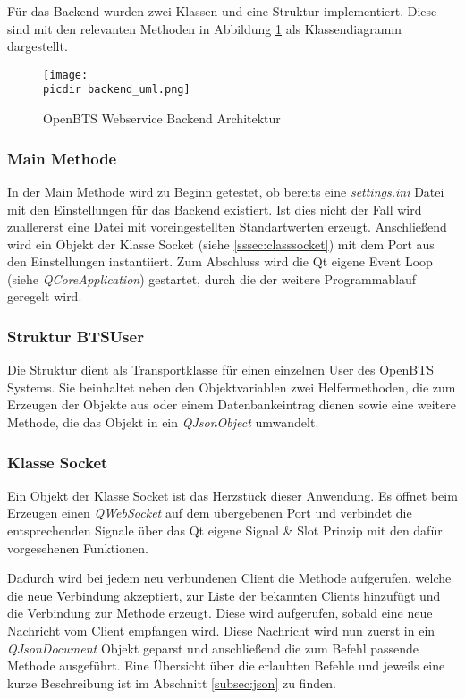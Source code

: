 Für das Backend wurden zwei Klassen und eine Struktur implementiert. Diese sind mit den relevanten Methoden in Abbildung \ref{fig:uml_class} als \UML Klassendiagramm dargestellt.
\begin{figure}[h!]
	\centering
	\texttt{[image: \\picdir backend\_uml.png]}
	\caption{OpenBTS Webservice Backend Architektur}
	\label{fig:uml_class}
\end{figure}

\subsubsection*{Main Methode}

In der Main Methode wird zu Beginn getestet, ob bereits eine \textit{settings.ini} Datei mit den Einstellungen für das Backend existiert. Ist dies nicht der Fall wird zuallererst eine Datei mit voreingestellten Standartwerten erzeugt. Anschließend wird ein Objekt der Klasse Socket (siehe \ref{sssec:classsocket}) mit dem Port aus den Einstellungen instantiiert. Zum Abschluss wird die Qt eigene Event Loop (siehe \textit{QCoreApplication}) gestartet, durch die der weitere Programmablauf geregelt wird.

\subsubsection*{Struktur BTSUser}
Die Struktur dient als Transportklasse für einen einzelnen User des OpenBTS Systems. Sie beinhaltet neben den Objektvariablen zwei Helfermethoden, die zum Erzeugen der Objekte aus \JSON oder einem Datenbankeintrag dienen sowie eine weitere Methode, die das Objekt in ein \textit{QJsonObject} umwandelt.


\subsubsection*{Klasse Socket}
\label{sssec:classsocket}
Ein Objekt der Klasse Socket ist das Herzstück dieser Anwendung. Es öffnet beim Erzeugen einen \textit{QWebSocket} auf dem übergebenen Port und verbindet die entsprechenden Signale über das Qt eigene Signal \& Slot Prinzip mit den dafür vorgesehenen Funktionen.

Dadurch wird bei jedem neu verbundenen Client die Methode  aufgerufen, welche die neue Verbindung akzeptiert, zur Liste der bekannten Clients hinzufügt und die Verbindung zur  Methode erzeugt. Diese wird aufgerufen, sobald eine neue Nachricht vom Client empfangen wird. Diese Nachricht wird nun zuerst in ein \textit{QJsonDocument} Objekt geparst und anschließend die zum Befehl passende Methode ausgeführt. Eine Übersicht über die erlaubten Befehle und jeweils eine kurze Beschreibung ist im Abschnitt \ref{subsec:json} zu finden.


